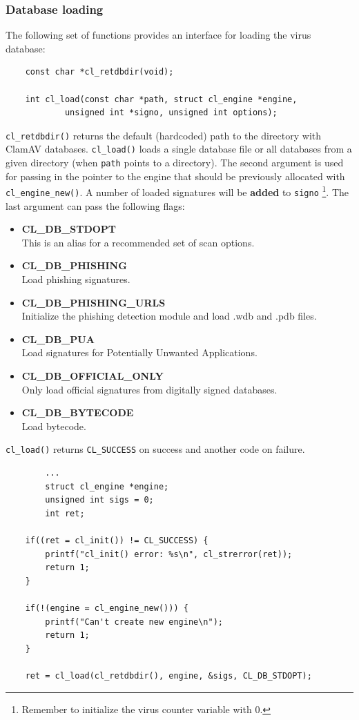 \documentclass[a4paper,titlepage,12pt]{article}
\begin{document}
    \subsubsection{Database loading}
    The following set of functions provides an interface for loading
    the virus database:
    \begin{verbatim}
	const char *cl_retdbdir(void);

	int cl_load(const char *path, struct cl_engine *engine,
		    unsigned int *signo, unsigned int options);
    \end{verbatim}
    \verb+cl_retdbdir()+ returns the default (hardcoded) path to the directory
    with ClamAV databases.
    \verb+cl_load()+ loads a single database file or all databases from a
    given directory (when \verb+path+ points to a directory). The second
    argument is used for passing in the pointer to the engine that should
    be previously allocated with \verb+cl_engine_new()+. A number of loaded
    signatures will be \textbf{added} to \verb+signo+ \footnote{Remember to
    initialize the virus counter variable with 0.}. The last argument can
    pass the following flags:
    \begin{itemize}
	\item \textbf{CL\_DB\_STDOPT}\\
	This is an alias for a recommended set of scan options.
	\item \textbf{CL\_DB\_PHISHING}\\
	Load phishing signatures.
	\item \textbf{CL\_DB\_PHISHING\_URLS}\\
	Initialize the phishing detection module and load .wdb and .pdb files.
	\item \textbf{CL\_DB\_PUA}\\
	Load signatures for Potentially Unwanted Applications.
	\item \textbf{CL\_DB\_OFFICIAL\_ONLY}\\
	Only load official signatures from digitally signed databases.
	\item \textbf{CL\_DB\_BYTECODE}\\
	Load bytecode.
    \end{itemize}
    \verb+cl_load()+ returns \verb+CL_SUCCESS+ on success and another code on
    failure.
    \begin{verbatim}
	    ...
	    struct cl_engine *engine;
	    unsigned int sigs = 0;
	    int ret;

	if((ret = cl_init()) != CL_SUCCESS) {
	    printf("cl_init() error: %s\n", cl_strerror(ret));
	    return 1;
	}

	if(!(engine = cl_engine_new())) {
	    printf("Can't create new engine\n");
	    return 1;
	}

	ret = cl_load(cl_retdbdir(), engine, &sigs, CL_DB_STDOPT);
    \end{verbatim}
\end{document}

